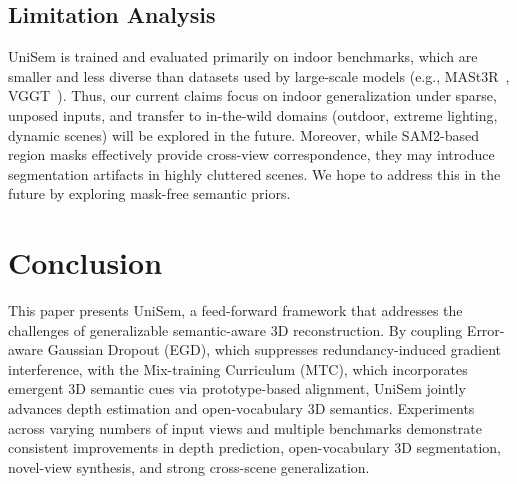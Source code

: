 \documentclass[runningheads]{llncs}
\begin{document}
\subsection{Limitation Analysis} \label{Analysis_limitations} 
UniSem is trained and evaluated primarily on indoor benchmarks, which are smaller and less diverse than datasets used by large-scale models (e.g., MASt3R~\cite{mast3r}, VGGT~\cite{vggt}). Thus, our current claims focus on indoor generalization under sparse, unposed inputs, and transfer to in-the-wild domains (outdoor, extreme lighting, dynamic scenes) will be explored in the future. 
Moreover, while SAM2-based region masks effectively provide cross-view correspondence, they may introduce segmentation artifacts in highly cluttered scenes. We hope to address this in the future by exploring mask-free semantic priors. 


\section{Conclusion} \label{sec:conclusion}
This paper presents UniSem, a feed-forward framework that addresses the challenges of generalizable semantic-aware 3D reconstruction. 
By coupling Error-aware Gaussian Dropout (EGD), which suppresses redundancy-induced gradient interference, with the Mix-training Curriculum (MTC), which incorporates emergent 3D semantic cues via prototype-based alignment, UniSem jointly advances depth estimation and open-vocabulary 3D semantics. 
Experiments across varying numbers of input views and multiple benchmarks demonstrate consistent improvements in depth prediction, open-vocabulary 3D segmentation, novel-view synthesis, and strong cross-scene generalization.  



\clearpage 



\end{document}
